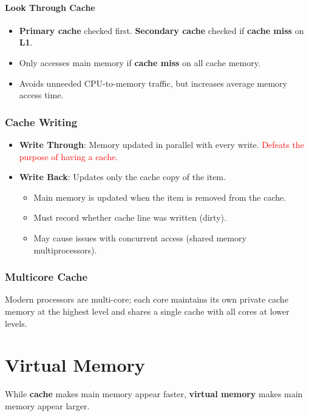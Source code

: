 \documentclass[12pt, letterpaper]{article}
\begin{document}
\subsection*{Look Through Cache}

\begin{itemize}
  \item \textbf{Primary cache} checked first. \textbf{Secondary
    cache} checked if \textbf{cache miss} on \textbf{L1}.
  \item Only accesses main memory if \textbf{cache miss} on all
    cache memory.
  \item Avoids unneeded CPU-to-memory traffic, but increases average
    memory access time.
\end{itemize}

\section*{Cache Writing}

\begin{itemize}
  \item \textbf{Write Through}: Memory updated in parallel with every
    write. \textcolor{red}{Defeats the purpose of having a cache.}
  \item \textbf{Write Back}: Updates only the cache copy of the item.
    \begin{itemize}
      \item Main memory is updated when the item is removed from the cache.
      \item Must record whether cache line was written (dirty).
      \item May cause issues with concurrent access (shared memory
        multiprocessors).
    \end{itemize}
\end{itemize}

\section*{Multicore Cache}

Modern processors are multi-core; each core maintains its own private
cache memory at the highest level and shares a single cache with all
cores at lower levels.

\part*{Virtual Memory}

While \textbf{cache} makes main memory appear faster, \textbf{virtual
memory} makes main memory appear larger.
\end{document}
